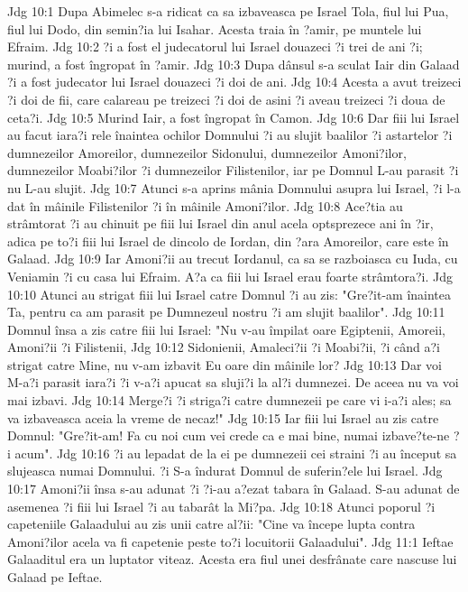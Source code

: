 Jdg 10:1  Dupa Abimelec s-a ridicat ca sa izbaveasca pe Israel Tola, fiul lui Pua, fiul lui Dodo, din semin?ia lui Isahar. Acesta traia în ?amir, pe muntele lui Efraim.
Jdg 10:2  ?i a fost el judecatorul lui Israel douazeci ?i trei de ani ?i; murind, a fost îngropat în ?amir.
Jdg 10:3  Dupa dânsul s-a sculat Iair din Galaad ?i a fost judecator lui Israel douazeci ?i doi de ani.
Jdg 10:4  Acesta a avut treizeci ?i doi de fii, care calareau pe treizeci ?i doi de asini ?i aveau treizeci ?i doua de ceta?i.
Jdg 10:5  Murind Iair, a fost îngropat în Camon.
Jdg 10:6  Dar fiii lui Israel au facut iara?i rele înaintea ochilor Domnului ?i au slujit baalilor ?i astartelor ?i dumnezeilor Amoreilor, dumnezeilor Sidonului, dumnezeilor Amoni?ilor, dumnezeilor Moabi?ilor ?i dumnezeilor Filistenilor, iar pe Domnul L-au parasit ?i nu L-au slujit.
Jdg 10:7  Atunci s-a aprins mânia Domnului asupra lui Israel, ?i l-a dat în mâinile Filistenilor ?i în mâinile Amoni?ilor.
Jdg 10:8  Ace?tia au strâmtorat ?i au chinuit pe fiii lui Israel din anul acela optsprezece ani în ?ir, adica pe to?i fiii lui Israel de dincolo de Iordan, din ?ara Amoreilor, care este în Galaad.
Jdg 10:9  Iar Amoni?ii au trecut Iordanul, ca sa se razboiasca cu Iuda, cu Veniamin ?i cu casa lui Efraim. A?a ca fiii lui Israel erau foarte strâmtora?i.
Jdg 10:10  Atunci au strigat fiii lui Israel catre Domnul ?i au zis: "Gre?it-am înaintea Ta, pentru ca am parasit pe Dumnezeul nostru ?i am slujit baalilor".
Jdg 10:11  Domnul însa a zis catre fiii lui Israel: "Nu v-au împilat oare Egiptenii, Amoreii, Amoni?ii ?i Filistenii,
Jdg 10:12  Sidonienii, Amaleci?ii ?i Moabi?ii, ?i când a?i strigat catre Mine, nu v-am izbavit Eu oare din mâinile lor?
Jdg 10:13  Dar voi M-a?i parasit iara?i ?i v-a?i apucat sa sluji?i la al?i dumnezei. De aceea nu va voi mai izbavi.
Jdg 10:14  Merge?i ?i striga?i catre dumnezeii pe care vi i-a?i ales; sa va izbaveasca aceia la vreme de necaz!"
Jdg 10:15  Iar fiii lui Israel au zis catre Domnul: "Gre?it-am! Fa cu noi cum vei crede ca e mai bine, numai izbave?te-ne ?i acum".
Jdg 10:16  ?i au lepadat de la ei pe dumnezeii cei straini ?i au început sa slujeasca numai Domnului. ?i S-a îndurat Domnul de suferin?ele lui Israel.
Jdg 10:17  Amoni?ii însa s-au adunat ?i ?i-au a?ezat tabara în Galaad. S-au adunat de asemenea ?i fiii lui Israel ?i au tabarât la Mi?pa.
Jdg 10:18  Atunci poporul ?i capeteniile Galaadului au zis unii catre al?ii: "Cine va începe lupta contra Amoni?ilor acela va fi capetenie peste to?i locuitorii Galaadului".
Jdg 11:1  Ieftae Galaaditul era un luptator viteaz. Acesta era fiul unei desfrânate care nascuse lui Galaad pe Ieftae.
